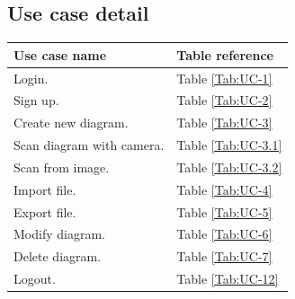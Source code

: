 \subsection{Use case detail}
\begin{table}[b]
\begin{tabular}{| m{8cm} | m{6cm} |}
\hline
Use case name & Table reference\\ \hline
Login. & Table \ref{Tab:UC-1}\\ \hline
Sign up. & Table \ref{Tab:UC-2}\\ \hline
Create new diagram. & Table \ref{Tab:UC-3}\\ \hline
Scan diagram with camera. & Table \ref{Tab:UC-3.1}\\ \hline
Scan from image. & Table \ref{Tab:UC-3.2}\\ \hline
Import file. & Table \ref{Tab:UC-4}\\ \hline
Export file. & Table \ref{Tab:UC-5}\\ \hline
Modify diagram. & Table \ref{Tab:UC-6}\\ \hline
Delete diagram. & Table \ref{Tab:UC-7}\\ \hline
Logout. & Table \ref{Tab:UC-12}\\ \hline
\end{tabular}
\end{table}

